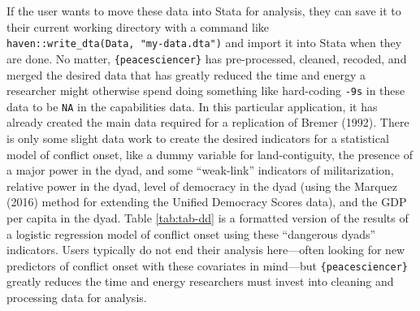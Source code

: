 \documentclass[
  11pt,
]{article}
\begin{document}
If the user wants to move these data into Stata for analysis, they can save it to their current working directory with a command like \texttt{haven::write\_dta(Data,\ "my-data.dta")} and import it into Stata when they are done. No matter, \texttt{\{peacesciencer\}} has pre-processed, cleaned, recoded, and merged the desired data that has greatly reduced the time and energy a researcher might otherwise spend doing something like hard-coding \texttt{-9s} in these data to be \texttt{NA} in the capabilities data. In this particular application, it has already created the main data required for a replication of Bremer (1992). There is only some slight data work to create the desired indicators for a statistical model of conflict onset, like a dummy variable for land-contiguity, the presence of a major power in the dyad, and some ``weak-link'' indicators of militarization, relative power in the dyad, level of democracy in the dyad (using the Marquez (2016) method for extending the Unified Democracy Scores data), and the GDP per capita in the dyad. Table \ref{tab:tab-dd} is a formatted version of the results of a logistic regression model of conflict onset using these ``dangerous dyads'' indicators. Users typically do not end their analysis here---often looking for new predictors of conflict onset with these covariates in mind---but \texttt{\{peacesciencer\}} greatly reduces the time and energy researchers must invest into cleaning and processing data for analysis.
\end{document}
